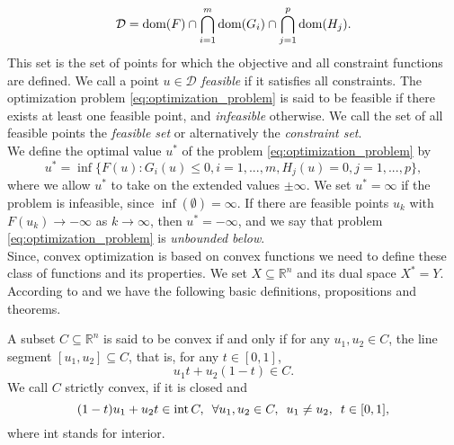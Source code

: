         \begin{equation}
            \mathcal{D} = \textnormal{dom}(F) \cap \bigcap_{i = 1}^{m} \textnormal{dom}(G_{i}) \cap \bigcap_{j = 1}^{p} \textnormal{dom}(H_{j}).
            \label{eq:domain_of_optimization_problem}
        \end{equation}
    This set is the set of points for which the objective and all constraint functions are defined. We call a point $u \in \mathcal{D}$ \textit{feasible} if it satisfies all constraints. The optimization problem \ref{eq:optimization_problem} is said to be feasible if there exists at least one feasible point, and \textit{infeasible} otherwise. We call the set of all feasible points the \textit{feasible set} or alternatively the \textit{constraint set}.\\
    We define the optimal value $u^{\ast}$ of the problem \ref{eq:optimization_problem} by
        $$
            u^{\ast} = \inf \big\{ F(u) : G_{i}(u) \le 0, i = 1, ..., m, H_{j}(u) = 0, j = 1, ..., p \big\},
        $$
    where we allow $u^{\ast}$ to take on the extended values $\pm \infty$. We set $u^{\ast} = \infty$ if the problem is infeasible, since $\inf(\emptyset) = \infty$. If there are feasible points $u_{k}$ with $F(u_{k}) \longrightarrow -\infty$ as $k \longrightarrow \infty$, then $u^{\ast} = -\infty$, and we say that problem \ref{eq:optimization_problem} is \textit{unbounded below}.\\

    Since, convex optimization is based on convex functions we need to define these class of functions and its properties. We set $X \subseteq \mathbb{R}^{n}$ and its dual space $X^{\ast} = Y$. According to \cite{Chambolle-et-al-10} and \cite{Rockafellar} we have the following basic definitions, propositions and theorems.

    \begin{definition} %
    \label{def:convex_set}

        A subset $C \subseteq \mathbb{R}^{n}$ is said to be convex if and only if for any $u_{1}, u_{2} \in C$, the line segment $[u_{1}, u_{2}] \subseteq C$, that is, for any $t \in [0, 1]$,
            \begin{equation}
                u_{1}t + u_{2}(1 - t) \in C.
                \label{eq:convex_set}
            \end{equation}
        We call $C$ strictly convex, if it is closed and
            \begin{equation}
                (1 - t)u_{1} + u_{2}t \in \textnormal{int}\,C, \,\,\, \forall u_{1}, u_{2} \in C, \,\,\, u_{1} \ne u_{2}, \,\,\, t \in [0, 1],
                \label{eq:strictly_convex_set}
            \end{equation}
        where \textnormal{int} stands for interior.

    \end{definition}

